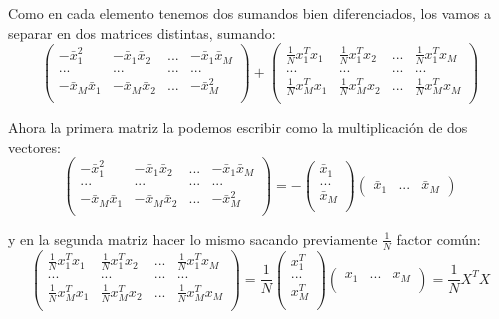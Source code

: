\documentclass[12pt]{article}
\theoremstyle{definition}
\begin{document}
\begin{pregunta}
Como en cada elemento tenemos dos sumandos bien diferenciados, los vamos a separar en dos matrices distintas, sumando:
\[ \left( \begin{array}{cccc}
		-\bar{x}_1^2 & -\bar{x}_1\bar{x}_2 & ... & -\bar{x}_1\bar{x}_M \\
		... & ... & ... & ...\\
		-\bar{x}_M\bar{x}_1 & -\bar{x}_M\bar{x}_2 & ... & -\bar{x}_M^2 \\ \end{array} \right)   +
		 \left( \begin{array}{cccc}
		\frac{1}{N}x_1^Tx_1 &  \frac{1}{N}x_1^Tx_2 & ... &  \frac{1}{N}x_1^Tx_M \\
		... & ... & ... & ...\\
		\frac{1}{N}x_M^Tx_1 &  \frac{1}{N}x_M^Tx_2 & ... &  \frac{1}{N}x_M^Tx_M \\ \end{array} \right)   
\]

Ahora la primera matriz la podemos escribir como la multiplicación de dos vectores:
\[ \left( \begin{array}{cccc}
		-\bar{x}_1^2 & -\bar{x}_1\bar{x}_2 & ... & -\bar{x}_1\bar{x}_M \\
		... & ... & ... & ...\\
		-\bar{x}_M\bar{x}_1 & -\bar{x}_M\bar{x}_2 & ... & -\bar{x}_M^2 \\ \end{array} \right) =
		- \left( \begin{array}{c}
		\bar{x}_1 \\
		... \\
		\bar{x}_M \\ \end{array} \right)
		\left( \begin{array}{ccc}
		\bar{x}_1 & ... & \bar{x}_M  \end{array} \right)
\]

y en la segunda matriz hacer lo mismo sacando previamente $\frac{1}{N}$ factor común:
\[ 	\left( \begin{array}{cccc}
		\frac{1}{N}x_1^Tx_1 &  \frac{1}{N}x_1^Tx_2 & ... &  \frac{1}{N}x_1^Tx_M \\
		... & ... & ... & ...\\
		\frac{1}{N}x_M^Tx_1 &  \frac{1}{N}x_M^Tx_2 & ... &  \frac{1}{N}x_M^Tx_M \\ \end{array} \right)  =
		\frac{1}{N} \left( \begin{array}{c}
		x_1^T \\
		...\\
		x_M^T \\ \end{array} \right)
		\left( \begin{array}{ccc}
		x_1 & ... & x_M \\ \end{array} \right) = \frac{1}{N}X^TX
\]


\end{pregunta}
\end{document}
